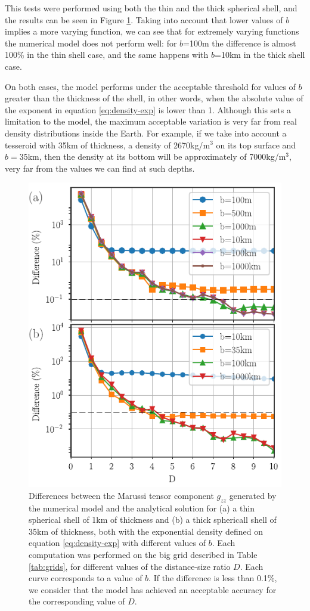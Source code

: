 \documentclass[extra]{gji}
\begin{document}
This tests were performed using both the thin and the thick spherical shell, and the results can be seen in Figure \ref{fig:D-exp-power}.
Taking into account that lower values of $b$ implies a more varying function, we can see that for extremely varying functions the numerical model does not perform well: for $b$=100m the difference is almost 100\% in the thin shell case, and the same happens with $b$=10km in the thick shell case.

On both cases, the model performs under the acceptable threshold for values of $b$ greater than the thickness of the shell, in other words, when the absolute value of the exponent in equation \ref{eq:density-exp} is lower than 1.
Although this sets a limitation to the model, the maximum acceptable variation is very far from real density distributions inside the Earth.
For example, if we take into account a tesseroid with 35km of thickness, a density of 2670kg/m$^3$ on its top surface and $b=35$km, then the density at its bottom will be approximately of 7000kg/m$^3$, very far from the values we can find at such depths.

\begin{figure}
\centering
\includegraphics[width=0.9\linewidth]{figures/Dexp-power-differences.pdf}
\caption{
    Differences between the Marussi tensor component $g_{zz}$ generated by the numerical model and the analytical solution for (a) a thin spherical shell of 1km of thickness and (b) a thick sphericall shell of 35km of thickness, both with the exponential density defined on equation \ref{eq:density-exp} with different values of $b$. Each computation was performed on the big grid described in Table \ref{tab:grids}, for different values of the distance-size ratio $D$. Each curve corresponds to a value of $b$. If the difference is less than 0.1\%, we consider that the model has achieved an acceptable accuracy for the corresponding value of $D$.
}
\label{fig:D-exp-power}
\end{figure}
\end{document}
